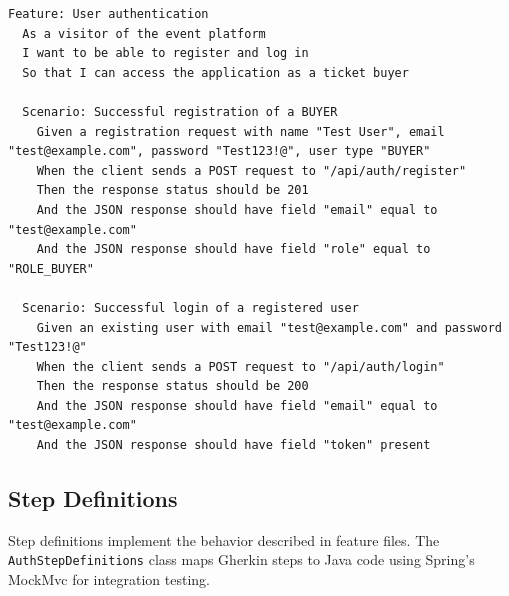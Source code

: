 \documentclass[12pt,a4paper]{article}
\begin{document}
\begin{lstlisting}[caption={Authentication Feature File}, label={lst:cucumber-feature}]
Feature: User authentication
  As a visitor of the event platform
  I want to be able to register and log in
  So that I can access the application as a ticket buyer

  Scenario: Successful registration of a BUYER
    Given a registration request with name "Test User", email "test@example.com", password "Test123!@", user type "BUYER"
    When the client sends a POST request to "/api/auth/register"
    Then the response status should be 201
    And the JSON response should have field "email" equal to "test@example.com"
    And the JSON response should have field "role" equal to "ROLE_BUYER"

  Scenario: Successful login of a registered user
    Given an existing user with email "test@example.com" and password "Test123!@"
    When the client sends a POST request to "/api/auth/login"
    Then the response status should be 200
    And the JSON response should have field "email" equal to "test@example.com"
    And the JSON response should have field "token" present
\end{lstlisting}

\subsection{Step Definitions}

Step definitions implement the behavior described in feature files. The \texttt{AuthStepDefinitions} class maps Gherkin steps to Java code using Spring's MockMvc for integration testing.
\end{document}
